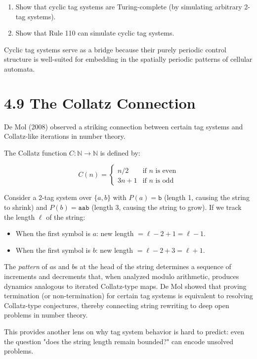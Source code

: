 \begin{enumerate}
  \item Show that cyclic tag systems are Turing-complete (by simulating arbitrary 2-tag systems).
  \item Show that Rule 110 can simulate cyclic tag systems.
\end{enumerate}

Cyclic tag systems serve as a bridge because their purely periodic control structure is well-suited for embedding in the spatially periodic patterns of cellular automata.

\section{4.9 The Collatz Connection}

De Mol (2008) observed a striking connection between certain tag systems and Collatz-like iterations in number theory.

The Collatz function $C: \mathbb{N} \to \mathbb{N}$ is defined by:

\[
C(n) = \begin{cases} n/2 & \text{if } n \text{ is even} \\ 3n + 1 & \text{if } n \text{ is odd} \end{cases}
\]

Consider a 2-tag system over $\{ a, b\} $ with $P(a) = \texttt{b}$ (length 1, causing the string to shrink) and $P(b) = \texttt{aab}$ (length 3, causing the string to grow). If we track the length $\ell$ of the string:

\begin{itemize}
  \item When the first symbol is $a$: new length $= \ell - 2 + 1 = \ell - 1$.
  \item When the first symbol is $b$: new length $= \ell - 2 + 3 = \ell + 1$.
\end{itemize}

The \textit{pattern} of $a$s and $b$s at the head of the string determines a sequence of increments and decrements that, when analyzed modulo arithmetic, produces dynamics analogous to iterated Collatz-type maps. De Mol showed that proving termination (or non-termination) for certain tag systems is equivalent to resolving Collatz-type conjectures, thereby connecting string rewriting to deep open problems in number theory.

This provides another lens on why tag system behavior is hard to predict: even the question "does the string length remain bounded?" can encode unsolved problems.

